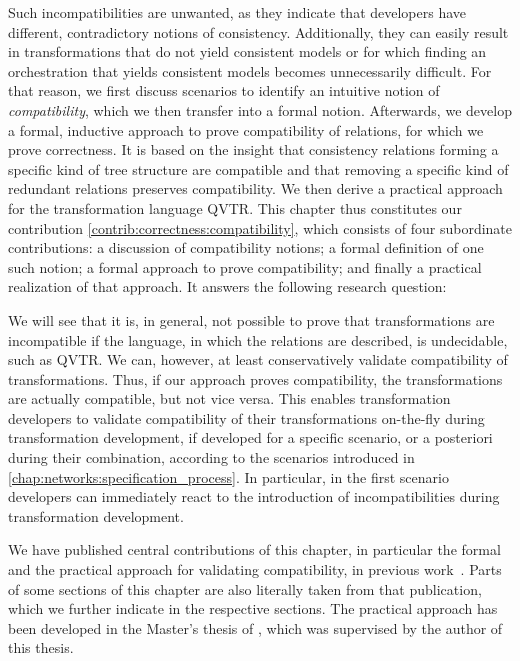 Such incompatibilities are unwanted, as they indicate that developers have different, contradictory notions of consistency.
Additionally, they can easily result in transformations that do not yield consistent models or for which finding an orchestration that yields consistent models becomes unnecessarily difficult.
For that reason, we first discuss scenarios to identify an intuitive notion of \emph{compatibility}, which we then transfer into a formal notion.
Afterwards, we develop a formal, inductive approach to prove compatibility of relations, for which we prove correctness.
It is based on the insight that consistency relations forming a specific kind of tree structure are compatible and that removing a specific kind of redundant relations preserves compatibility.
We then derive a practical approach for the transformation language \gls{QVTR}.
This chapter thus constitutes our contribution \autoref{contrib:correctness:compatibility}, which consists of four subordinate contributions: a discussion of compatibility notions; a formal definition of one such notion; a formal approach to prove compatibility; and finally a practical realization of that approach.
It answers the following research question:


We will see that it is, in general, not possible to prove that transformations are incompatible if the language, in which the relations are described, is undecidable, such as \gls{QVTR}.
We can, however, at least conservatively validate compatibility of transformations.
Thus, if our approach proves compatibility, the transformations are actually compatible, but not vice versa.
This enables transformation developers to validate compatibility of their transformations on-the-fly during transformation development, if developed for a specific scenario, or a posteriori during their combination, according to the scenarios introduced in \autoref{chap:networks:specification_process}.
In particular, in the first scenario developers can immediately react to the introduction of incompatibilities during transformation development.

We have published central contributions of this chapter, in particular the formal and the practical approach for validating compatibility, in previous work~.
Parts of some sections of this chapter are also literally taken from that publication, which we further indicate in the respective sections.
The practical approach has been developed in the Master's thesis of , which was supervised by the author of this thesis.





